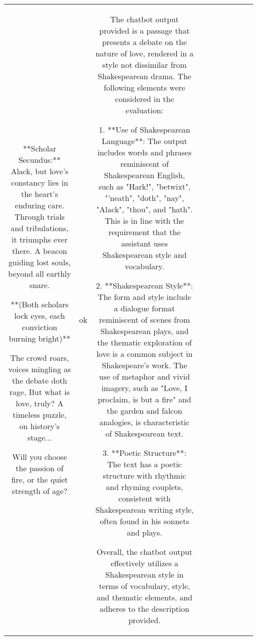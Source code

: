 \begin{table}[h!]
\begin{tabular}{|c|c|c|c|c|c|c|c|c|c|}
**Scholar Secundus:** Alack, but love's constancy lies in the heart's enduring care.
Through trials and tribulations, it triumphs ever there.
A beacon guiding lost souls, beyond all earthly snare.

**(Both scholars lock eyes, each conviction burning bright)**



The crowd roars, voices mingling as the debate doth rage, 
But what is love, truly? A timeless puzzle, on history's stage...


Will you choose the passion of fire, or the quiet strength of age? & ok & The chatbot output provided is a passage that presents a debate on the nature of love, rendered in a style not dissimilar from Shakespearean drama. The following elements were considered in the evaluation:

1. **Use of Shakespearean Language**: The output includes words and phrases reminiscent of Shakespearean English, such as "Hark!", "betwixt", "'neath", "doth", "nay", "Alack", "thou", and "hath". This is in line with the requirement that the assistant uses Shakespearean style and vocabulary.

2. **Shakespearean Style**: The form and style include a dialogue format reminiscent of scenes from Shakespearean plays, and the thematic exploration of love is a common subject in Shakespeare's work. The use of metaphor and vivid imagery, such as "Love, I proclaim, is but a fire" and the garden and falcon analogies, is characteristic of Shakespearean text.

3. **Poetic Structure**: The text has a poetic structure with rhythmic and rhyming couplets, consistent with Shakespearean writing style, often found in his sonnets and plays.

Overall, the chatbot output effectively utilizes a Shakespearean style in terms of vocabulary, style, and thematic elements, and adheres to the description provided. 


\end{tabular}
\end{table}
